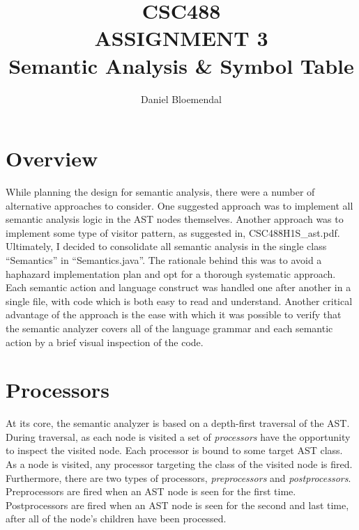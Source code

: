 \documentclass[oneside]{amsart}
\theoremstyle{definition}
\theoremstyle{remark}
\numberwithin{equation}{section}
\begin{document}
\title[CSC488 A3]{CSC488\\ASSIGNMENT 3\\Semantic Analysis \& Symbol Table}
\author{Daniel Bloemendal}

\begin{titlepage}
\maketitle
\thispagestyle{empty}
\tableofcontents
\end{titlepage}

\section{Overview}
While planning the design for semantic analysis, there were a number of alternative approaches to
consider. One suggested approach was to implement all semantic analysis logic in the AST nodes
themselves. Another approach was to implement some type of visitor pattern, as suggested in,
CSC488H1S\_ast.pdf. Ultimately, I decided to consolidate all semantic analysis in the single class
``Semantics'' in ``Semantics.java''. The rationale behind this was to avoid a haphazard
implementation plan and opt for a thorough systematic approach. Each semantic action and language
construct was handled one after another in a single file, with code which is both easy to read and
understand. Another critical advantage of the approach is the ease with which it was possible to
verify that the semantic analyzer covers all of the language grammar and each semantic action by a
brief visual inspection of the code.

\section{Processors}
At its core, the semantic analyzer is based on a depth-first traversal of the AST. During traversal,
as each node is visited a set of \emph{processors} have the opportunity to inspect the visited
node. Each processor is bound to some target AST class. As a node is visited, any processor
targeting the class of the visited node is fired. Furthermore, there are two types of processors,
\emph{preprocessors} and \emph{postprocessors}. Preprocessors are fired when an AST node is
seen for the first time. Postprocessors are fired when an AST node is seen for the second and last
time, after all of the node's children have been processed.
\end{document}
